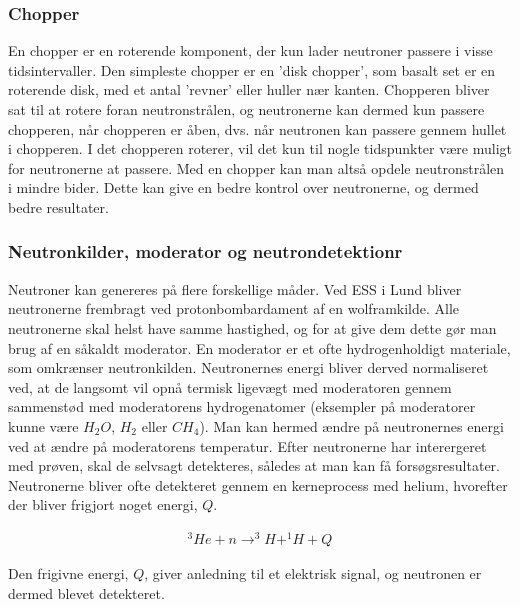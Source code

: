 \documentclass[12pt,oneside,a4paper]{article}
\begin{document}
{{{{{\subsubsection{Chopper}
En chopper er en roterende komponent, der kun lader neutroner passere i visse tidsintervaller. Den simpleste chopper er en 'disk chopper', som basalt set er en roterende disk, med et antal 'revner' eller huller nær kanten. Chopperen bliver sat til at rotere foran neutronstrålen, og neutronerne kan dermed kun passere chopperen, når chopperen er åben, dvs. når neutronen kan passere gennem hullet i chopperen. I det chopperen roterer, vil det kun til nogle tidspunkter være muligt for neutronerne at passere. Med en chopper kan man altså opdele neutronstrålen i mindre bider. Dette kan give en bedre kontrol over neutronerne, og dermed bedre resultater. \cite{ess_folder}

\subsubsection{Neutronkilder, moderator og neutrondetektionr}
Neutroner kan genereres på flere forskellige måder. Ved ESS i Lund bliver neutronerne frembragt ved protonbombardament af en wolframkilde. Alle neutronerne skal helst have samme hastighed, og for at give dem dette gør man brug af en såkaldt moderator. En moderator er et ofte hydrogenholdigt materiale, som omkrænser neutronkilden. Neutronernes energi bliver derved normaliseret ved, at de langsomt vil opnå termisk ligevægt med moderatoren gennem sammenstød med moderatorens hydrogenatomer (eksempler på moderatorer kunne være $H_2O$, $H_2$ eller $CH_4$). Man kan hermed ændre på neutronernes energi ved at ændre på moderatorens temperatur. 
Efter neutronerne har interergeret med prøven, skal de selvsagt detekteres, således at man kan få forsøgsresultater. Neutronerne 
bliver ofte detekteret gennem en kerneprocess med helium, hvorefter der bliver frigjort noget energi, $Q$. \cite{lefmann_arleth_kirkensgaard_lebech_thomsen}

\begin{align}
^3He + n \to  ^3H + ^1H + Q
\end{align}

Den frigivne energi, $Q$, giver anledning til et elektrisk signal, og neutronen er dermed blevet detekteret.





}}}}}
\end{document}
